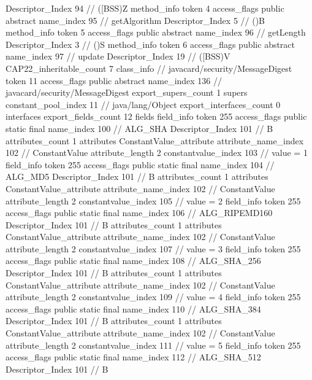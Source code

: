 {{{{{					Descriptor_Index	94		// ([BSS)Z
				}
				method_info {
					token	4
					access_flags	public abstract
					name_index	95		// getAlgorithm
					Descriptor_Index	5		// ()B
				}
				method_info {
					token	5
					access_flags	public abstract
					name_index	96		// getLength
					Descriptor_Index	3		// ()S
				}
				method_info {
					token	6
					access_flags	public abstract
					name_index	97		// update
					Descriptor_Index	19		// ([BSS)V
				}
			}
			CAP22_inheritable_count	7
		}
		class_info {		// javacard/security/MessageDigest
			token	11
			access_flags	public abstract
			name_index	136		// javacard/security/MessageDigest
			export_supers_count	1
			supers {
				constant_pool_index	11		// java/lang/Object
			}
			export_interfaces_count	0
			interfaces {
			}
			export_fields_count	12
			fields {
			field_info {
				token	255
				access_flags	public static final
				name_index	100		// ALG_SHA
				Descriptor_Index	101		// B
				attributes_count	1
				attributes {
				ConstantValue_attribute {
					attribute_name_index	102		// ConstantValue
					attribute_length	2
					constantvalue_index	103		// value = 1
				}
				}
			}
			field_info {
				token	255
				access_flags	public static final
				name_index	104		// ALG_MD5
				Descriptor_Index	101		// B
				attributes_count	1
				attributes {
				ConstantValue_attribute {
					attribute_name_index	102		// ConstantValue
					attribute_length	2
					constantvalue_index	105		// value = 2
				}
				}
			}
			field_info {
				token	255
				access_flags	public static final
				name_index	106		// ALG_RIPEMD160
				Descriptor_Index	101		// B
				attributes_count	1
				attributes {
				ConstantValue_attribute {
					attribute_name_index	102		// ConstantValue
					attribute_length	2
					constantvalue_index	107		// value = 3
				}
				}
			}
			field_info {
				token	255
				access_flags	public static final
				name_index	108		// ALG_SHA_256
				Descriptor_Index	101		// B
				attributes_count	1
				attributes {
				ConstantValue_attribute {
					attribute_name_index	102		// ConstantValue
					attribute_length	2
					constantvalue_index	109		// value = 4
				}
				}
			}
			field_info {
				token	255
				access_flags	public static final
				name_index	110		// ALG_SHA_384
				Descriptor_Index	101		// B
				attributes_count	1
				attributes {
				ConstantValue_attribute {
					attribute_name_index	102		// ConstantValue
					attribute_length	2
					constantvalue_index	111		// value = 5
				}
				}
			}
			field_info {
				token	255
				access_flags	public static final
				name_index	112		// ALG_SHA_512
				Descriptor_Index	101		// B
}}}}}
